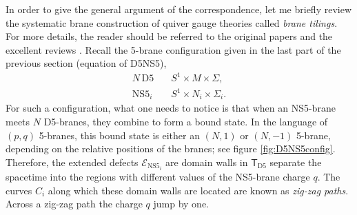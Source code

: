 In order to give the general argument of the correspondence, let me
briefly review the systematic brane construction of quiver gauge theories
called \emph{brane tilings}. For more details, the reader should be
referred to the original papers and the excellent reviews \cite{Hanany:2005ve,Franco:2005rj,Kennaway:2007tq,Yamazaki:2008bt}. Recall the 5-brane configuration given
in the last part of the previous section (equation of D5NS5),
\begin{align*}
    N\,\mathrm{D5}    & \quad S^{1} \times M \times \Sigma,  \\
    \mathrm{NS5}_{i} & \quad S^{1} \times N_{i} \times \Sigma_{i}.
\end{align*}
For such a configuration, what one needs to notice is that when an
NS5-brane meets $N$ D5-branes, they combine to form a bound state.
In the language of $\left( p,q \right)$ 5-branes, this bound state
is either an $\left( N,1 \right)$ or $\left( N,-1 \right)$ 5-brane,
depending on the relative positions of the branes; see figure \ref{fig:D5NS5config}. Therefore,
the extended defects $\mathcal{E}_{\mathrm{NS5}_{i}}$ are domain
walls in $\mathsf{T}_{\mathrm{D5}}$ separate the spacetime into the
regions with different values of the NS5-brane charge $q$. The curves
$C_{i}$ along which these domain walls are located are known as \emph{zig-zag
paths}. Across a zig-zag path the charge $q$ jump by one.


